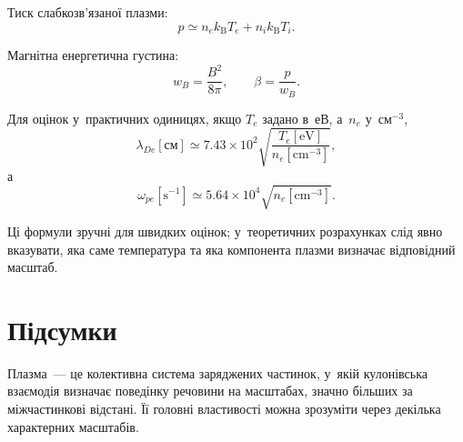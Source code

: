Тиск слабкозв'язаної плазми:
\begin{equation}
	p\simeq n_e k_{\mathrm B}T_e+n_i k_{\mathrm B}T_i.
\end{equation}

Магнітна енергетична густина:
\begin{equation}
	w_B=\frac{B^2}{8\pi},
	\qquad
	\beta=\frac{p}{w_B}.
\end{equation}

Для оцінок у~практичних одиницях, якщо $T_e$ задано в~еВ, а~$n_e$ у~$\mathrm{см}^{-3}$,
\begin{equation}
	\lambda_{De}[\mathrm{см}]
	\simeq
	7.43\times10^2
	\sqrt{\frac{T_e[\mathrm{eV}]}{n_e[\mathrm{cm}^{-3}]}},
\end{equation}
а
\begin{equation}
	\omega_{pe}[\mathrm{s}^{-1}]
	\simeq
	5.64\times10^4
	\sqrt{n_e[\mathrm{cm}^{-3}]}.
\end{equation}

Ці формули зручні для швидких оцінок; у~теоретичних розрахунках слід явно вказувати, яка саме температура та яка компонента плазми визначає відповідний масштаб.



\section*{Підсумки}



 {}

Плазма~--- це колективна система заряджених частинок, у~якій кулонівська взаємодія визначає поведінку речовини на масштабах, значно більших за міжчастинкові відстані. Її головні властивості можна зрозуміти через декілька характерних масштабів.

